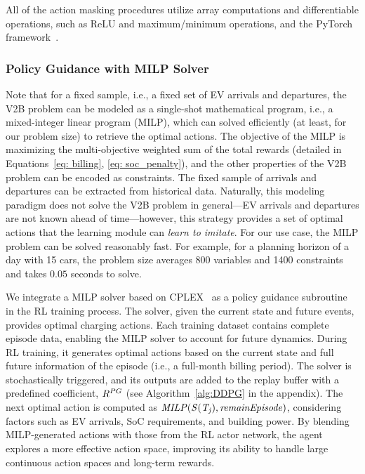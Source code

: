 All of the action masking procedures utilize array computations and differentiable operations, such as ReLU \cite{rasamoelina2020review} and maximum/minimum operations, and the PyTorch framework~\cite{paszke2017automatic}. 

\subsubsection{Policy Guidance with MILP Solver}
Note that for a fixed sample, i.e., a fixed set of EV arrivals and departures, the V2B problem can be modeled as a single-shot mathematical program, i.e., a mixed-integer linear program (MILP), which can solved efficiently (at least, for our problem size) to retrieve the optimal actions. The objective of the MILP is maximizing the multi-objective weighted sum of the total rewards (detailed in Equations~\ref{eq: billing}, \eqref{eq: soc_penalty}), and the other properties of the V2B problem can be encoded as constraints. The fixed sample of arrivals and departures can be extracted from historical data. Naturally, this modeling paradigm does not solve the V2B problem in general---EV arrivals and departures are not known ahead of time---however, this strategy provides a set of optimal actions that the learning module can \textit{learn to imitate}. For our use case, the MILP problem can be solved reasonably fast. For example, for a planning horizon of a day with 15 cars, the problem size averages 800 variables and 1400 constraints and takes $0.05$ seconds to solve. 

We integrate a MILP solver based on CPLEX~\cite{cplex2009v12} as a policy guidance subroutine~\cite{pmlr-v28-levine13} in the RL training process. The solver, given the current state and future events, provides optimal charging actions.
{\color{black} Each training dataset contains complete episode data, enabling the MILP solver to account for future dynamics. During RL training, it generates optimal actions based on the current state and full future information of the episode (i.e., a full-month billing period).} The solver is stochastically triggered, and its outputs are added to the replay buffer with a predefined coefficient, ${R^{PG}}$ (see Algorithm~\ref{alg:DDPG} in the appendix). The next optimal action is computed as $\mathit{MILP(S(T_j), {\it remainEpisode})}$, considering factors such as EV arrivals, SoC requirements, and building power.
By blending MILP-generated actions with those from the RL actor network, the agent explores a more effective action space, improving its ability to handle large continuous action spaces and long-term rewards.%

